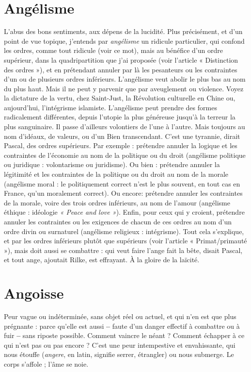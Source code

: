 \section{Angélisme}
L'abus des bons sentiments, aux dépens de la lucidité. Plus précisément,
et d’un point de vue topique, j'entends par {\it angélisme}
un ridicule particulier, qui confond les ordres, comme tout ridicule (voir ce
mot), mais au bénéfice d’un ordre supérieur, dans la quadripartition que j'ai
proposée (voir l’article « Distinction des ordres »), et en prétendant annuler par
là les pesanteurs ou les contraintes d’un ou de plusieurs ordres inférieurs.
L’angélisme veut abolir le plus bas au nom du plus haut. Mais il ne peut y parvenir
que par aveuglement ou violence. Voyez la dictature de la vertu, chez
Saint-Just, la Révolution culturelle en Chine ou, aujourd’hui, l’intégrisme islamiste.
L’angélisme peut prendre des formes radicalement différentes, depuis
l'utopie la plus généreuse jusqu’à la terreur la plus sanguinaire. Il passe
d’ailleurs volontiers de l’une à l’autre. Mais toujours au nom d’idéaux, de
valeurs, ou d’un Bien transcendant. C’est une tyrannie, dirait Pascal, des ordres
supérieurs. Par exemple : prétendre annuler la logique et les contraintes de
l’économie au nom de la politique ou du droit (angélisme politique ou
juridique : volontarisme ou juridisme). Ou bien : prétendre annuler la légitimité
et les contraintes de la politique ou du droit au nom de la morale (angélisme
moral : le politiquement correct n’est le plus souvent, en tout cas en
France, qu'un moralement correct). Ou encore: prétendre annuler les
contraintes de la morale, voire des trois ordres inférieurs, au nom de l'amour
(angélisme éthique : idéologie {\it « Peace and love »}). Enfin, pour ceux qui y
croient, prétendre annuler les contraintes ou les exigences de chacun de ces
ordres au nom d’un ordre divin ou surnaturel (angélisme religieux : intégrisme).
Tout cela s'explique, et par les ordres inférieurs plutôt que supérieurs
(voir l’article « Primat/primauté »), mais doit aussi se combattre : qui veut faire
l’ange fait la bête, disait Pascal, et tout ange, ajoutait Rilke, est effrayant. À la
gloire de la laïcité.

\section{Angoisse}
Peur vague ou indéterminée, sans objet réel ou actuel, et qui n’en
est que plus prégnante : parce qu’elle est aussi {\bf --} faute d’un
danger effectif à combattre ou à fuir {\bf --} sans riposte possible. Comment vaincre
le néant ? Comment échapper à ce qui n’est pas ou pas encore ? C’est une peur
intempestive et envahissante, qui nous étouffe ({\it angere}, en latin, signifie serrer,
étrangler) ou nous submerge. Le corps s’affole ; l’âme se noie.


